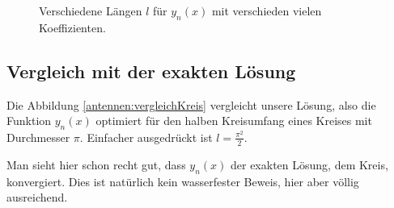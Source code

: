 \begin{figure}
\begin{subfigure}{0.48\textwidth}
	\end{subfigure}
	
	\caption{Verschiedene Längen $l$ für $y_n(x)$ mit verschieden vielen Koeffizienten.}
	\label{antennen:plotskoeff}
\end{figure}

\subsection{Vergleich mit der exakten Lösung\label{antennen:vergleich}}

Die Abbildung \ref{antennen:vergleichKreis} vergleicht unsere Lösung\footnotemark{}, also die 
Funktion $y_n(x)$ optimiert für den halben Kreisumfang eines Kreises mit Durchmesser $\pi$. 
Einfacher ausgedrückt ist $l=\frac{\pi^2}{2}$.


Man sieht hier schon recht gut, dass $y_n(x)$ der
exakten Lösung, dem Kreis, konvergiert. Dies ist
natürlich kein wasserfester Beweis, hier aber völlig  
ausreichend. 















